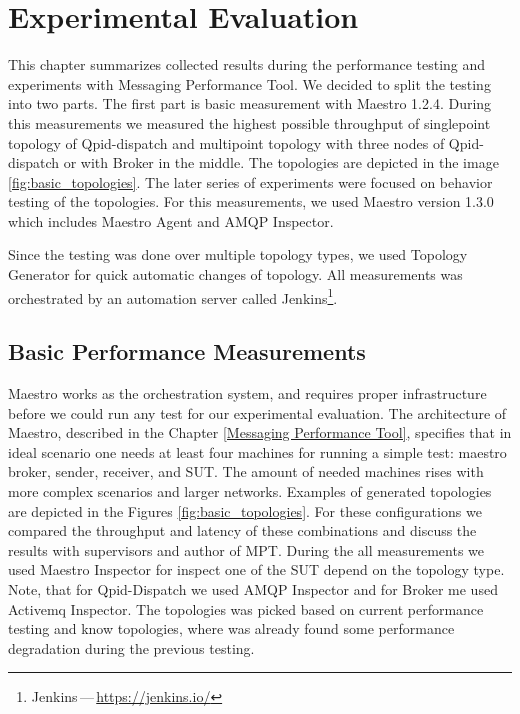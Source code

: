 
\chapter{Experimental Evaluation}
\label{Experimental Evaluation}
This chapter summarizes collected results during the performance testing and experiments with Messaging Performance Tool. We decided to split the testing into two parts. The first part is basic measurement with Maestro 1.2.4. During this measurements we measured the highest possible throughput of singlepoint topology of Qpid-dispatch and multipoint topology with three nodes of Qpid-dispatch or with Broker in the middle. The topologies are depicted in the image \ref{fig:basic_topologies}. The later series of experiments were focused on behavior testing of the topologies. For this measurements, we used Maestro version 1.3.0 which includes Maestro Agent and AMQP Inspector.

Since the testing was done over multiple topology types, we used Topology Generator for quick automatic changes of topology. All measurements was orchestrated by an automation server called Jenkins\footnote{Jenkins\,---\,\url{https://jenkins.io/}}.

\section{Basic Performance Measurements}
\label{Basic Performance Measurements}
Maestro works as the orchestration system, and requires proper infrastructure before we could run any test for our experimental evaluation. The architecture of Maestro, described in the Chapter \ref{Messaging Performance Tool}, specifies that in ideal scenario one needs at least four machines for running a simple test: maestro broker, sender, receiver, and SUT. The amount of needed machines rises with more complex scenarios and larger networks. Examples of generated topologies are depicted in the Figures \ref{fig:basic_topologies}. For these configurations we compared the throughput and latency of these combinations and discuss the results with supervisors and author of MPT. During the all measurements we used Maestro Inspector for inspect one of the SUT depend on the topology type. Note, that for Qpid-Dispatch we used AMQP Inspector and for Broker me used Activemq Inspector. The topologies was picked based on current performance testing and know topologies, where was already found some performance degradation during the previous testing.

